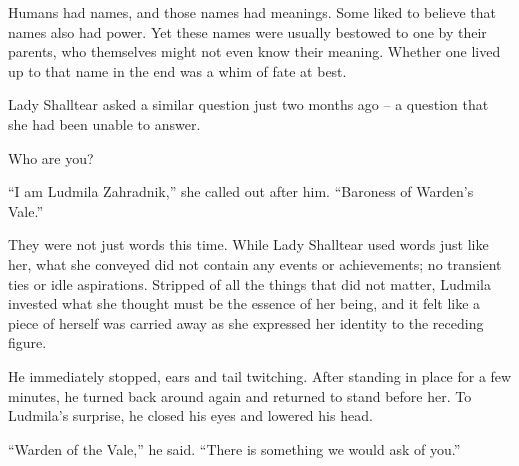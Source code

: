  

Humans had names, and those names had meanings. Some liked to believe that names also had power. Yet these names were usually bestowed to one by their parents, who themselves might not even know their meaning. Whether one lived up to that name in the end was a whim of fate at best.

 

Lady Shalltear asked a similar question just two months ago – a question that she had been unable to answer.

 

Who are you?

 

“I am Ludmila Zahradnik,” she called out after him. “Baroness of Warden’s Vale.”

 

They were not just words this time. While Lady Shalltear used words just like her, what she conveyed did not contain any events or achievements; no transient ties or idle aspirations. Stripped of all the things that did not matter, Ludmila invested what she thought must be the essence of her being, and it felt like a piece of herself was carried away as she expressed her identity to the receding figure.

 

He immediately stopped, ears and tail twitching. After standing in place for a few minutes, he turned back around again and returned to stand before her. To Ludmila’s surprise, he closed his eyes and lowered his head.

 

“Warden of the Vale,” he said. “There is something we would ask of you.”

